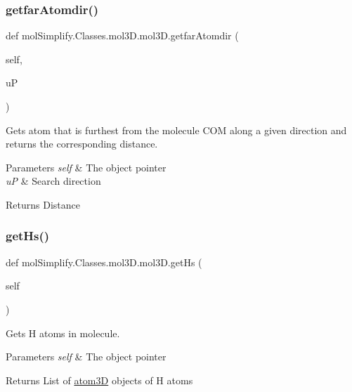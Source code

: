 \subsubsection{\texorpdfstring{getfar\+Atomdir()}{getfarAtomdir()}}
{\footnotesize\ttfamily def mol\+Simplify.\+Classes.\+mol3\+D.\+mol3\+D.\+getfar\+Atomdir (\begin{DoxyParamCaption}\item[{}]{self,  }\item[{}]{uP }\end{DoxyParamCaption})}



Gets atom that is furthest from the molecule C\+OM along a given direction and returns the corresponding distance. 


\begin{DoxyParams}{Parameters}
{\em self} & The object pointer \\
\hline
{\em uP} & Search direction \\
\hline
\end{DoxyParams}
\begin{DoxyReturn}{Returns}
Distance 
\end{DoxyReturn}
\mbox{\label{classmolSimplify_1_1Classes_1_1mol3D_1_1mol3D_a5b27778bb5e730b3911e0fe9192a4c0e}} 
\subsubsection{\texorpdfstring{get\+Hs()}{getHs()}}
{\footnotesize\ttfamily def mol\+Simplify.\+Classes.\+mol3\+D.\+mol3\+D.\+get\+Hs (\begin{DoxyParamCaption}\item[{}]{self }\end{DoxyParamCaption})}



Gets H atoms in molecule. 


\begin{DoxyParams}{Parameters}
{\em self} & The object pointer \\
\hline
\end{DoxyParams}
\begin{DoxyReturn}{Returns}
List of \hyperlink{namespacemolSimplify_1_1Classes_1_1atom3D}{atom3D} objects of H atoms 
\end{DoxyReturn}
\mbox{\label{classmolSimplify_1_1Classes_1_1mol3D_1_1mol3D_a232adbbe11745aac4561a15fe1850df4}} 
